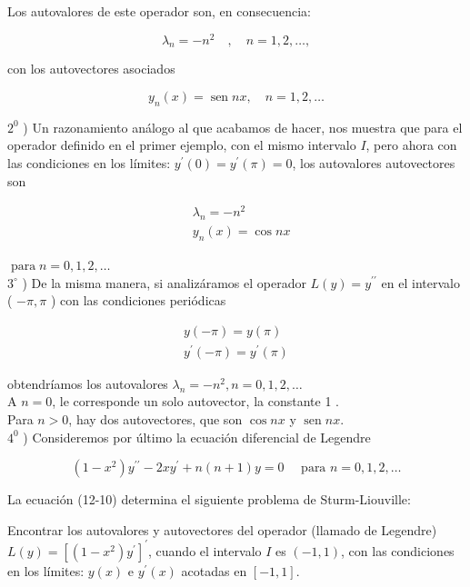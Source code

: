 \documentclass[10pt]{article}
\theoremstyle{plain}
\theoremstyle{definition}
\theoremstyle{remark}
\begin{document}
Los autovalores de este operador son, en consecuencia:


\begin{equation*}
\lambda_{n}=-n^{2} \quad, \quad n=1,2, \ldots, \tag{12-9}
\end{equation*}


con los autovectores asociados


\begin{equation*}
y_{n}(x)=\operatorname{sen} n x, \quad n=1,2, \ldots \tag{12-9'}
\end{equation*}


$2^{0}$ ) Un razonamiento análogo al que acabamos de hacer, nos muestra que para el operador definido en el primer ejemplo, con el mismo intervalo $I$, pero ahora con las condiciones en los límites: $y^{\prime}(0)=y^{\prime}(\pi)=0$, los autovalores autovectores son

$$
\begin{aligned}
& \lambda_{n}=-n^{2} \\
& y_{n}(x)=\cos n x
\end{aligned}
$$

$\operatorname{para} n=0,1,2, \ldots$\\
$3^{\circ}$ ) De la misma manera, si analizáramos el operador $L(y)=y^{\prime \prime}$ en el intervalo ( $-\pi, \pi$ ) con las condiciones periódicas

$$
\begin{gathered}
y(-\pi)=y(\pi) \\
y^{\prime}(-\pi)=y^{\prime}(\pi)
\end{gathered}
$$

obtendríamos los autovalores $\lambda_{n}=-n^{2}, n=0,1,2, \ldots$\\
A $n=0$, le corresponde un solo autovector, la constante 1 .\\
Para $n>0$, hay dos autovectores, que son $\cos n x$ y $\operatorname{sen} n x$.\\
$4^{0}$ ) Consideremos por último la ecuación diferencial de Legendre


\begin{equation*}
\left(1-x^{2}\right) y^{\prime \prime}-2 x y^{\prime}+n(n+1) y=0 \quad \text { para } n=0,1,2, \ldots \tag{12-10}
\end{equation*}


La ecuación (12-10) determina el siguiente problema de Sturm-Liouville:

Encontrar los autovalores y autovectores del operador (llamado de Legendre) $L(y)=\left[\left(1-x^{2}\right) y^{\prime}\right]^{\prime}$, cuando el intervalo $I$ es $(-1,1)$, con las condiciones en los límites: $y(x)$ e $y^{\prime}(x)$ acotadas en $[-1,1]$.
\end{document}
